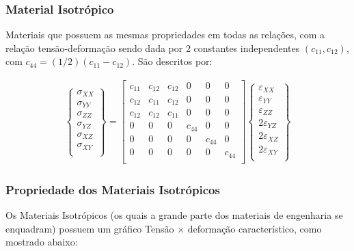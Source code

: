 \documentclass{article}
\begin{document}
\subsubsection*{Material Isotrópico}
Materiais que possuem as mesmas propriedades em todas as relações, com a relação tensão-deformação sendo dada por $2$ constantes independentes $(c_{11}, c_{12})$, com $c_{44} = (1/2)(c_{11} - c_{12})$. São descritos por:

\begin{align*}
    \begin{Bmatrix}
        \sigma_{XX} \\
        \sigma_{YY} \\
        \sigma_{ZZ} \\
        \sigma_{YZ} \\
        \sigma_{XZ} \\
        \sigma_{XY} \\
    \end{Bmatrix} =
    \begin{bmatrix}
        c_{11} & c_{12} & c_{12} & 0      & 0      & 0      \\
        c_{12} & c_{11} & c_{12} & 0      & 0      & 0      \\
        c_{12} & c_{12} & c_{11} & 0      & 0      & 0      \\
        0      & 0      & 0      & c_{44} & 0      & 0      \\
        0      & 0      & 0      & 0      & c_{44} & 0      \\
        0      & 0      & 0      & 0      & 0      & c_{44} \\
    \end{bmatrix}
    \begin{Bmatrix}
        \varepsilon_{XX}  \\
        \varepsilon_{YY}  \\
        \varepsilon_{ZZ}  \\
        2\varepsilon_{YZ} \\
        2\varepsilon_{XZ} \\
        2\varepsilon_{XY} \\
    \end{Bmatrix}
\end{align*}

\newpage
\subsubsection{Propriedade dos Materiais Isotrópicos}
Os Materiais Isotrópicos (os quais a grande parte dos materiais de engenharia se enquadram) possuem um gráfico Tensão $\times$ deformação característico, como mostrado abaixo:
\end{document}
